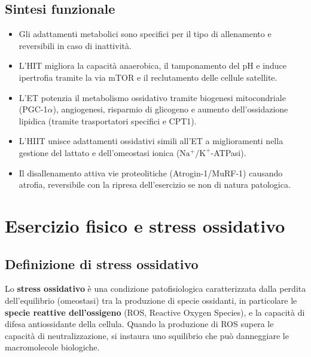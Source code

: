 \documentclass[12pt,a4paper]{report}
\begin{document}
\section{Sintesi funzionale}
\begin{itemize}
\item Gli adattamenti metabolici sono specifici per il tipo di allenamento e reversibili in caso di inattività.
\item L'HIT migliora la capacità anaerobica, il tamponamento del pH e induce ipertrofia tramite la via mTOR e il reclutamento delle cellule satellite.
\item L'ET potenzia il metabolismo ossidativo tramite biogenesi mitocondriale (PGC-1\(\alpha\)), angiogenesi, risparmio di glicogeno e aumento dell'ossidazione lipidica (tramite trasportatori specifici e CPT1).
\item L'HIIT unisce adattamenti ossidativi simili all'ET a miglioramenti nella gestione del lattato e dell'omeostasi ionica (\(\mathrm{Na^+/K^+}\)-ATPasi).
\item Il disallenamento attiva vie proteolitiche (Atrogin-1/MuRF-1) causando atrofia, reversibile con la ripresa dell'esercizio se non di natura patologica.
\end{itemize}



\chapter{Esercizio fisico e stress ossidativo}

\section{Definizione di stress ossidativo}
Lo \textbf{stress ossidativo} è una condizione patofisiologica caratterizzata dalla perdita dell'equilibrio (omeostasi) tra la produzione di specie ossidanti, in particolare le \textbf{specie reattive dell'ossigeno} (ROS, Reactive Oxygen Species), e la capacità di difesa antiossidante della cellula. Quando la produzione di ROS supera le capacità di neutralizzazione, si instaura uno squilibrio che può danneggiare le macromolecole biologiche.
\end{document}
